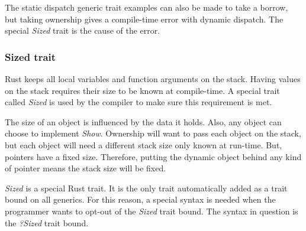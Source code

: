\documentclass[a4paper,10pt]{article}
\begin{document}
The static dispatch generic trait examples can also be made to take a borrow, but taking ownership gives a compile-time error with dynamic dispatch.
The special \textit{Sized} trait is the cause of the error.

\subsubsection{Sized trait}
Rust keeps all local variables and function arguments on the stack.
Having values on the stack requires their size to be known at compile-time.
A special trait called \textit{Sized} is used by the compiler to make sure this requirement is met. \cite{klabnik_2019_01}

The size of an object is influenced by the data it holds.
Also, any object can choose to implement \textit{Show}.
Ownership will want to pass each object on the stack, but each object will need a different stack size only known at run-time.
But, pointers have a fixed size.
Therefore, putting the dynamic object behind any kind of pointer means the stack size will be fixed.

\begin{notebox}
  \textit{Sized} is a special Rust trait.
  It is the only trait automatically added as a trait bound on all generics.
  For this reason, a special syntax is needed when the programmer wants to opt-out of the \textit{Sized} trait bound.
  The syntax in question is the \textit{?Sized} trait bound. \cite{klabnik_2019_01}
\end{notebox}
\end{document}
